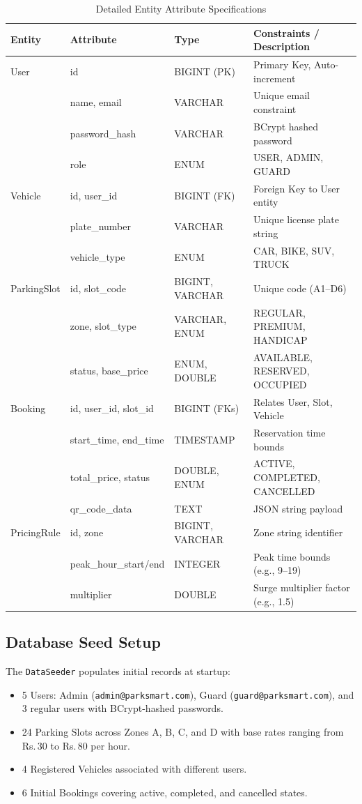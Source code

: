 \documentclass[conference,10pt]{IEEEtran}
\newcommand{\Rs}{\textrm{Rs.\,}}
\begin{document}
\begin{table}[ht]
\centering
\caption{Detailed Entity Attribute Specifications}
\label{tab:schema}
\footnotesize
\setlength{\tabcolsep}{2.5pt}
\begin{tabular}{@{}l l l L{2.6cm}@{}}
\toprule
\textbf{Entity} & \textbf{Attribute} & \textbf{Type} & \textbf{Constraints / Description} \\
\midrule
User & id & BIGINT (PK) & Primary Key, Auto-increment \\
 & name, email & VARCHAR & Unique email constraint \\
 & password\_hash & VARCHAR & BCrypt hashed password \\
 & role & ENUM & USER, ADMIN, GUARD \\
Vehicle & id, user\_id & BIGINT (FK) & Foreign Key to User entity \\
 & plate\_number & VARCHAR & Unique license plate string \\
 & vehicle\_type & ENUM & CAR, BIKE, SUV, TRUCK \\
ParkingSlot & id, slot\_code & BIGINT, VARCHAR & Unique code (A1--D6) \\
 & zone, slot\_type & VARCHAR, ENUM & REGULAR, PREMIUM, HANDICAP \\
 & status, base\_price & ENUM, DOUBLE & AVAILABLE, RESERVED, OCCUPIED \\
Booking & id, user\_id, slot\_id & BIGINT (FKs) & Relates User, Slot, Vehicle \\
 & start\_time, end\_time & TIMESTAMP & Reservation time bounds \\
 & total\_price, status & DOUBLE, ENUM & ACTIVE, COMPLETED, CANCELLED \\
 & qr\_code\_data & TEXT & JSON string payload \\
PricingRule & id, zone & BIGINT, VARCHAR & Zone string identifier \\
 & peak\_hour\_start/end & INTEGER & Peak time bounds (e.g., 9--19) \\
 & multiplier & DOUBLE & Surge multiplier factor (e.g., 1.5) \\
\bottomrule
\end{tabular}
\end{table}

\subsection{Database Seed Setup}

The \texttt{DataSeeder} populates initial records at startup:
\begin{itemize}[leftmargin=*]
    \item 5 Users: Admin (\texttt{admin@parksmart.com}), Guard (\texttt{guard@parksmart.com}), and 3 regular users with BCrypt-hashed passwords.
    \item 24 Parking Slots across Zones A, B, C, and D with base rates ranging from \Rs30 to \Rs80 per hour.
    \item 4 Registered Vehicles associated with different users.
    \item 6 Initial Bookings covering active, completed, and cancelled states.
\end{itemize}
\end{document}
